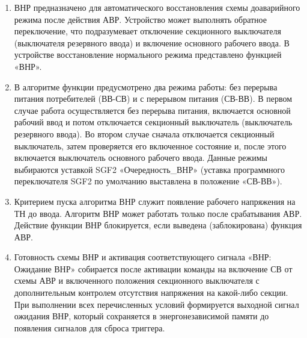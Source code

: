 
\color{black}

\begin{enumerate}

\item
ВНР предназначено для автоматического восстановления схемы доаварийного режима после действия АВР. Устройство может выполнять обратное переключение, что подразумевает отключение секционного выключателя (выключателя резервного ввода) и включение основного рабочего ввода. В устройстве восстановление нормального режима представлено функцией «ВНР».

\item
В алгоритме функции предусмотрено два режима работы: без перерыва питания потребителей (ВВ-СВ) и с перерывом питания (СВ-ВВ). В первом случае работа осуществляется без перерыва питания, включается основной рабочий ввод и потом отключается секционный выключатель (выключатель резервного ввода). Во  втором  случае  сначала  отключается  секционный  выключатель,  затем  проверяется  его  включенное состояние и, после этого включается выключатель основного рабочего ввода. Данные режимы выбираются уставкой SGF2 «Очередность\_ВНР» (уставка программного переключателя  SGF2  по  умолчанию выставлена в положение «СВ-ВВ»). 

\item
Критерием пуска алгоритма ВНР служит появление рабочего напряжения на ТН до ввода. Алгоритм ВНР может работать только после срабатывания АВР. Действие функции ВНР блокируется, если выведена (заблокирована) функция АВР. 

\item
Готовность  схемы  ВНР  и  активация  соответствующего  сигнала «ВНР:  Ожидание  ВНР» собирается после активации команды на включение СВ от схемы АВР и включенного положения секционного выключателя с дополнительным контролем отсутствия напряжения на какой-либо секции. При выполнении всех перечисленных условий формируется выходной сигнал ожидания  ВНР, который сохраняется  в энергонезависимой памяти до появления сигналов для сброса триггера.


\end{enumerate}
